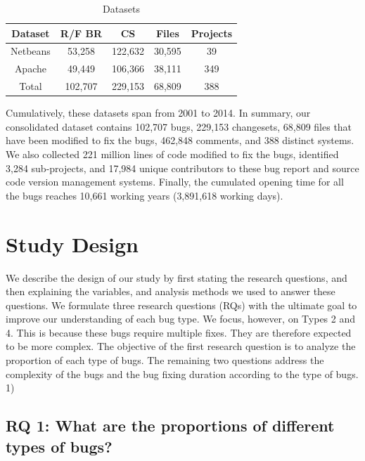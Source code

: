 \begin{table}[h]
\begin{center}
\begin{tabular}{@{}c|c|c|c|c@{}}
\textbf{Dataset} & \textbf{R/F BR} & \textbf{CS} & \textbf{Files} & \textbf{Projects} \\ \hline \hline
Netbeans         & 53,258          & 122,632     & 30,595         & 39                \\
Apache           & 49,449          & 106,366     & 38,111         & 349               \\
Total            & 102,707         & 229,153     & 68,809         & 388               \\ \hline \hline

\end{tabular}
\end{center}

\caption{Datasets\label{table:datasets}}
\end{table}

Cumulatively, these datasets span from 2001 to 2014. In
summary, our consolidated dataset contains 102,707 bugs,
229,153 changesets, 68,809 files that have been modified to
fix the bugs, 462,848 comments, and 388 distinct systems.
We also collected 221 million lines of code modified to fix
the bugs, identified 3,284 sub-projects, and 17,984 unique
contributors to these bug report and source code version
management systems. Finally, the cumulated opening time for
all the bugs reaches 10,661 working years (3,891,618
working days).

\section{Study Design}

We describe the design of our study by first stating the
research questions, and then explaining the variables, and
analysis methods we used to answer these questions. We
formulate three research questions (RQs) with the ultimate
goal to improve our understanding of each bug type. We
focus, however, on Types 2 and 4. This is because these bugs
require multiple fixes. They are therefore expected to be more
complex.
The objective of the first research question is to analyze
the proportion of each type of bugs. The remaining two
questions address the complexity of the bugs and the bug
fixing duration according to the type of bugs.
1)

\subsection{RQ 1: What are the proportions of different types of bugs?}

